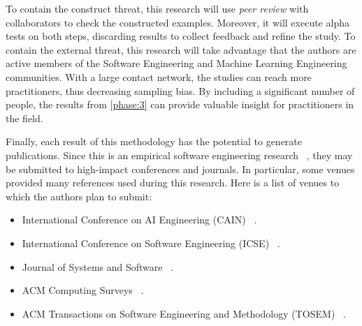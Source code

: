   To contain the construct threat, this research will use \emph{peer review}
  with collaborators to check the constructed examples. Moreover, it will
  execute alpha tests on both steps, discarding results to collect feedback
  and refine the study. To contain the external threat, this research will
  take advantage that the authors are active members of the Software Engineering
  and Machine Learning Engineering communities. With a large contact network,
  the studies can reach more practitioners, thus decreasing sampling bias.
  By including a significant number of people, the results from \cref{phase:3}
  can provide valuable insight for practitioners in the field.

  Finally, each result of this methodology has the potential to generate
  publications. Since this is an empirical software engineering research%
  ~\parencite{Shull2008GuideEngineering}, they may be submitted to high-impact
  conferences and journals. In particular, some venues provided many references
  used during this research. Here is a list of venues to which the authors
  plan to submit:
  \begin{itemize}
    \item International Conference on AI Engineering (CAIN)%
          ~\parencite{   
            Granlund2021MLOpsCases,
            Lewis2021CharacterizingSystems,
            Makinen2021WhoHelp,
            Nahar2023APractitioners,
            Serban2021PracticesApplications,
          }.
    \item International Conference on Software Engineering (ICSE)%
          ~\parencite{
            Amershi2019SoftwareStudy,
            Kolltveit2022OperationalizingReview,
            Nahar2021MoreProjects,
          }.
    \item Journal of Systems and Software%
          ~\parencite{
            Foidl2024DataDevelopers,
            Giray2021AChallenges,
            Steidl2023ThePractice,
          }.
    \item ACM Computing Surveys%
          ~\parencite{
            Diaz-De-Arcaya2023ASurvey,
            Paleyes2022ChallengesStudies,
          }.
    \item ACM Transactions on Software Engineering and Methodology (TOSEM)%
          ~\parencite{Martinez-Fernandez2022SoftwareSurvey}.
  \end{itemize}

